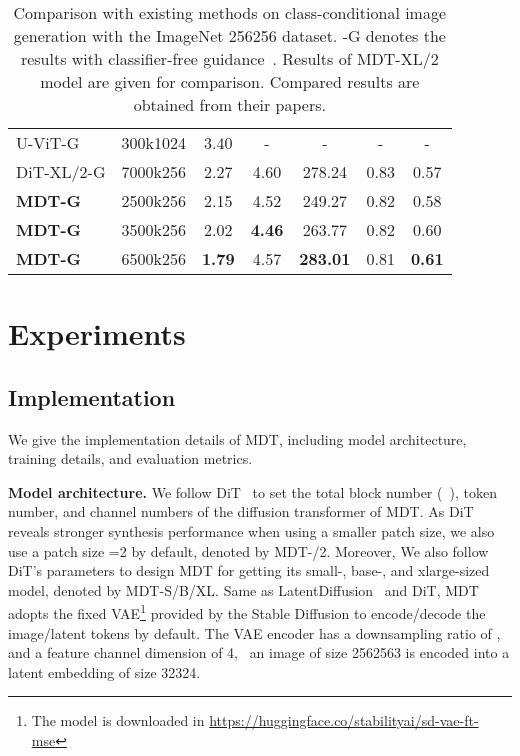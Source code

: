 \documentclass[final]{cvpr}
\newcommand{\myPara}[1]{\vspace{.08in} \noindent\textbf{#1}}
\begin{document}
\begin{table}
\begin{tabular}{lcccccc}
        U-ViT-G~\cite{bao2022all}     & 300k1024 & 3.40 & - & - & - & - \\
        \hdashline
        DiT-XL/2-G\cite{peebles2022scalable} & 7000k256 & 2.27 & 4.60 & 278.24 & 0.83 & 0.57 \\
        \textbf{MDT-G} & 2500k256  & 2.15  & 4.52 & 249.27 & 0.82 & 0.58 \\
        \textbf{MDT-G} & 3500k256  & 2.02  & \textbf{4.46} & 263.77 & 0.82 & 0.60 \\ 
        \textbf{MDT-G} & 6500k256  & \textbf{1.79}  & 4.57 & \textbf{283.01} & 0.81 & \textbf{0.61} \\         
        \bottomrule
    \end{tabular}
    \vspace{2pt}
    \caption{Comparison with existing methods on class-conditional image generation 
    with the ImageNet 256256 dataset. 
    -G denotes the results with classifier-free guidance~\cite{ho2022classifier}.
    Results of MDT-XL/2 model are given for comparison.
    Compared results are obtained from their papers.}
    \label{tab:sota_comp}
    \end{table}


\section{Experiments}\label{exp}

\subsection{Implementation}
We give the implementation details
of MDT, including model architecture, training details,
 and evaluation metrics. 


\myPara{Model architecture.} 
We follow DiT~\cite{peebles2022scalable} to set the total block number (\ie~), token number, and channel numbers of the diffusion transformer of MDT. 
As DiT reveals stronger synthesis performance when using a smaller patch size, 
we also use a patch size =2 by default,
denoted by MDT-/2. Moreover, We also follow DiT's parameters to design MDT for getting its small-, base-, and xlarge-sized model, denoted by MDT-S/B/XL.
Same as LatentDiffusion~\cite{rombach2022high} and DiT,
MDT adopts the fixed 
VAE\footnote{The model is downloaded in \url{https://huggingface.co/stabilityai/sd-vae-ft-mse}} provided by the Stable Diffusion
to encode/decode the image/latent tokens by default.
The VAE encoder has a downsampling ratio of , and a  feature channel dimension of 4, 
\eg~an image of size 2562563 is encoded into a latent embedding of size 32324.
\end{document}
